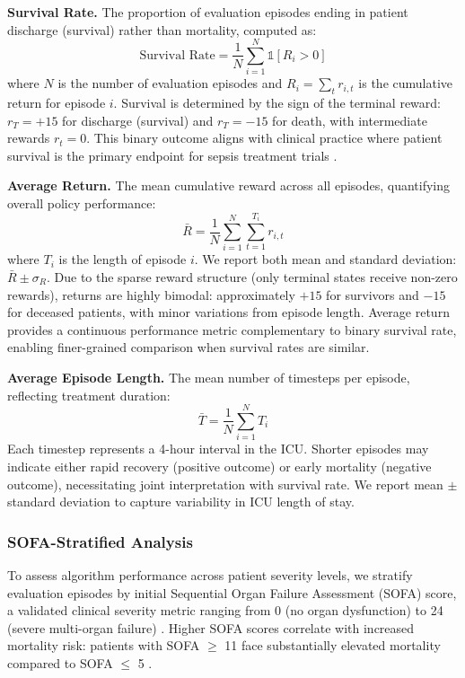 \textbf{Survival Rate.} The proportion of evaluation episodes ending in patient discharge (survival) rather than mortality, computed as:
\begin{equation}
\text{Survival Rate} = \frac{1}{N} \sum_{i=1}^N \mathbb{1}[R_i > 0]
\end{equation}
where $N$ is the number of evaluation episodes and $R_i = \sum_t r_{i,t}$ is the cumulative return for episode $i$. Survival is determined by the sign of the terminal reward: $r_T = +15$ for discharge (survival) and $r_T = -15$ for death, with intermediate rewards $r_t = 0$. This binary outcome aligns with clinical practice where patient survival is the primary endpoint for sepsis treatment trials \citep{seymour2017sepsis_criteria}.

\textbf{Average Return.} The mean cumulative reward across all episodes, quantifying overall policy performance:
\begin{equation}
\bar{R} = \frac{1}{N} \sum_{i=1}^N \sum_{t=1}^{T_i} r_{i,t}
\end{equation}
where $T_i$ is the length of episode $i$. We report both mean and standard deviation: $\bar{R} \pm \sigma_R$. Due to the sparse reward structure (only terminal states receive non-zero rewards), returns are highly bimodal: approximately $+15$ for survivors and $-15$ for deceased patients, with minor variations from episode length. Average return provides a continuous performance metric complementary to binary survival rate, enabling finer-grained comparison when survival rates are similar.

\textbf{Average Episode Length.} The mean number of timesteps per episode, reflecting treatment duration:
\begin{equation}
\bar{T} = \frac{1}{N} \sum_{i=1}^N T_i
\end{equation}
Each timestep represents a 4-hour interval in the ICU. Shorter episodes may indicate either rapid recovery (positive outcome) or early mortality (negative outcome), necessitating joint interpretation with survival rate. We report mean $\pm$ standard deviation to capture variability in ICU length of stay.

\subsubsection{SOFA-Stratified Analysis}

To assess algorithm performance across patient severity levels, we stratify evaluation episodes by initial Sequential Organ Failure Assessment (SOFA) score, a validated clinical severity metric ranging from 0 (no organ dysfunction) to 24 (severe multi-organ failure) \citep{vincent1996sofa}. Higher SOFA scores correlate with increased mortality risk: patients with SOFA $\geq$ 11 face substantially elevated mortality compared to SOFA $\leq$ 5 \citep{seymour2017sepsis_criteria}.

